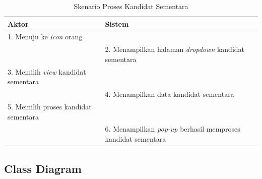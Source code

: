 \begin{enumerate}
\begin{itemize}
\end{itemize}

\begin{table}
	\caption{Skenario Proses Kandidat Sementara}
	\centering
	\begin{tabular}{ | l | p{64mm}|}
		\hline 
		\textbf{Aktor} & \textbf{Sistem} \\
		\hline
		
			1.	Menuju ke \textit{icon} orang&  \\
			
			\hline
			
			&  2.	Menampilkan halaman  \textit{dropdown} kandidat sementara \\
			
			\hline
			
			3. Memilih \textit{view} kandidat sementara & \\
			
			\hline
			
			& 4. Menampilkan data kandidat sementara \\
			\hline
			
			
			5. Memilih proses kandidat sementara &  \\
			\hline
			
			& 6. Menampilkan \textit{pop-up }berhasil memproses kandidat sementara \\
			\hline
			
	\end{tabular}
\end{table}

\end{enumerate}

\subsection{Class Diagram}

